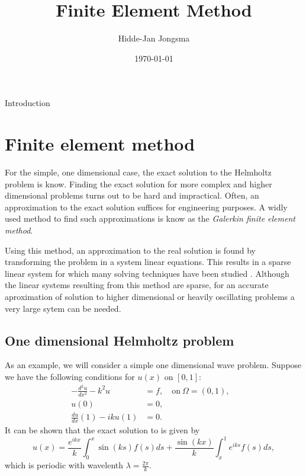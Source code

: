 \documentclass[a4paper]{article}
\author{Hidde-Jan Jongsma}
\title{Finite Element Method}
\date{\today}
\begin{document}
Introduction

\section{Finite element method}

For the simple, one dimensional case, the exact solution to the
Helmholtz problem is know. Finding the exact solution for more complex
and higher dimensional problems turns out to be hard and impractical.
Often, an approximation to the exact solution suffices for engineering
purposes. A widly used method to find such approximations is know as
the \emph{Galerkin finite element method}.

Using this method, an approximation to the real solution is found by
transforming the problem in a system linear equations.  This results
in a sparse linear system for which many solving techniques have been
studied \cite{}. Although the linear systems resulting from this
method are sparse, for an accurate aproximation of solution to higher
dimensional or heavily oscillating problems a very large sytem can be
needed.

%

\subsection{One dimensional Helmholtz problem}

As an example, we will consider a simple one dimensional wave problem.
Suppose we have the following conditions for $u(x)$ on $[0, 1]$:
\begin{align}
    - \frac{d^2u}{dx^2} - k^2 u
      & = f, \quad \text{on}\ \Omega = (0, 1), \\
    u(0) & = 0, \label{eq:dirbc} \\
    \frac{du}{dx}(1) - i k u(1) & = 0. \label{eq:impbc} &
\end{align}
It can be shown that the exact solution to is given by
\begin{equation}
  u(x) = \frac{e^{ikx}}{k} \int^x_0 \sin(ks)f(s) ds
          + \frac{\sin(kx)}{k} \int^1_x e^{iks} f(s) ds,
\end{equation}
which is periodic with wavelenth $\lambda = \frac{2\pi}{k}$.
\end{document}
